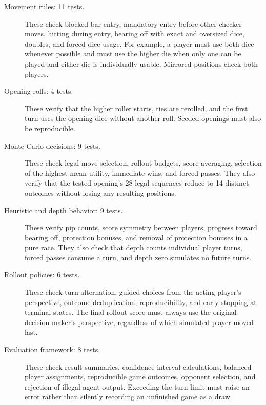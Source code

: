 \documentclass[12pt,twoside]{article}
\begin{document}
\begin{description}
    \item[Movement rules: 11 tests.]
    These check blocked bar entry, mandatory entry before other checker moves,
    hitting during entry, bearing off with exact and oversized dice, doubles,
    and forced dice usage. For example, a player must use both dice whenever
    possible and must use the higher die when only one can be played and either
    die is individually usable. Mirrored positions check both players.

    \item[Opening rolls: 4 tests.]
    These verify that the higher roller starts, ties are rerolled, and the
    first turn uses the opening dice without another roll. Seeded openings
    must also be reproducible.

    \item[Monte Carlo decisions: 9 tests.]
    These check legal move selection, rollout budgets, score averaging,
    selection of the highest mean utility, immediate wins, and forced passes.
    They also verify that the tested opening's 28 legal sequences reduce to
    14 distinct outcomes without losing any resulting positions.

    \item[Heuristic and depth behavior: 9 tests.]
    These verify pip counts, score symmetry between players, progress toward
    bearing off, protection bonuses, and removal of protection bonuses in a
    pure race. They also check that depth counts individual player turns,
    forced passes consume a turn, and depth zero simulates no future turns.

    \item[Rollout policies: 6 tests.]
    These check turn alternation, guided choices from the acting player's
    perspective, outcome deduplication, reproducibility, and early stopping
    at terminal states. The final rollout score must always use the original
    decision maker's perspective, regardless of which simulated player moved last.

    \item[Evaluation framework: 8 tests.]
    These check result summaries, confidence-interval calculations, balanced
    player assignments, reproducible game outcomes, opponent selection, and
    rejection of illegal agent output. Exceeding the turn limit must raise an
    error rather than silently recording an unfinished game as a draw.
\end{description}
\end{document}
